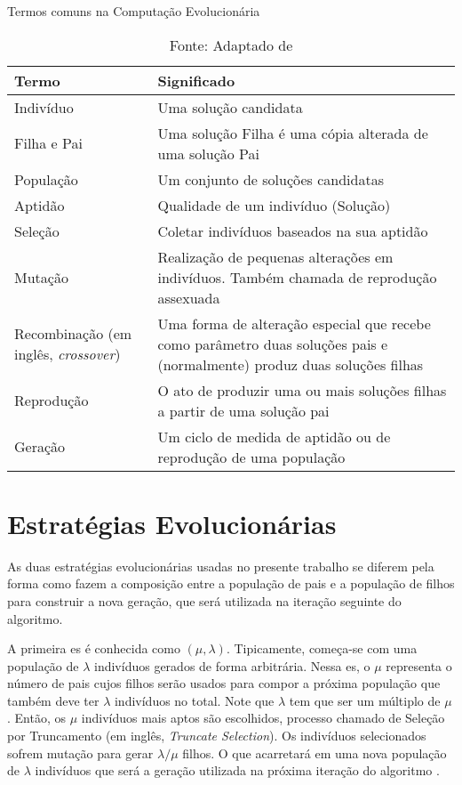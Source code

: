 \begin{table}[tp]
	\centering
	\caption{Termos comuns na Computação Evolucionária}
	\label{tbl:evo_dict}
	\begin{tabularx}{\linewidth}{|X|X|}
		\hline
		\textbf{Termo} & \textbf{Significado} \\
		\hline
		Indivíduo & Uma solução candidata \\
		\hline
		Filha e Pai & Uma solução Filha é uma cópia alterada de uma solução Pai \\
		\hline
		População & Um conjunto de soluções candidatas \\
		\hline
		Aptidão & Qualidade de um indivíduo (Solução) \\
		\hline
		Seleção & Coletar indivíduos baseados na sua aptidão \\
		\hline
		Mutação & Realização de pequenas alterações em indivíduos. Também chamada de reprodução assexuada \\
		\hline
		Recombinação (em inglês, \textit{crossover}) & Uma forma de alteração especial que recebe como parâmetro duas soluções pais e (normalmente) produz duas soluções filhas \\
		\hline
		Reprodução & O ato de produzir uma ou mais soluções filhas a partir de uma solução pai \\
		\hline
		Geração & Um ciclo de medida de aptidão ou de reprodução de uma população \\
		\hline
	\end{tabularx}
	\caption*{Fonte: Adaptado de \citep{Luke2013Metaheuristics}}
\end{table}

\section{Estratégias Evolucionárias}

As duas estratégias evolucionárias usadas no presente trabalho se diferem pela 
forma como fazem a composição entre a população de pais e a população de filhos 
para construir a nova geração, que será utilizada na iteração seguinte do 
algoritmo.

A primeira \ac{es} é conhecida como $( \mu, \lambda )$. Tipicamente, começa-se 
com uma população de $\lambda$ indivíduos gerados de forma arbitrária. Nessa 
\ac{es}, o $\mu$ representa o número de pais cujos filhos serão usados para compor 
a próxima população que também deve ter $\lambda$ indivíduos no total. Note que 
$\lambda$ tem que ser um múltiplo de $\mu$. Então, os $\mu$ indivíduos mais 
aptos são escolhidos, processo chamado de Seleção por Truncamento (em inglês, 
\textit{Truncate Selection}). Os indivíduos selecionados sofrem mutação para 
gerar $ \lambda / \mu $ filhos. O que acarretará em uma nova população de 
$\lambda$ indivíduos que será a geração utilizada na próxima iteração do 
algoritmo \citep{Luke2013Metaheuristics}.

